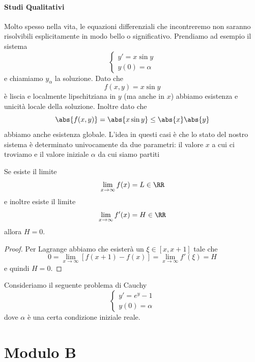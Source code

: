 \documentclass[11pt]{scrartcl}
\begin{document}
	\subsection{Studi Qualitativi}
	
	Molto spesso nella vita, le equazioni differenziali che incontreremo non saranno risolvibili esplicitamente in modo bello o significativo. Prendiamo ad esempio il sistema
	$$
	\begin{cases}
		y'=x\sin y \\
		y(0)=\alpha
	\end{cases}
	$$
	e chiamiamo $y_\alpha$ la soluzione. Dato che 
	$$f(x,y)=x\sin y$$
	è liscia e localmente lipschitziana in $y$ (ma anche in $x$) abbiamo esistenza e unicità locale della soluzione. Inoltre dato che
	$$\abs{f(x,y)}=\abs{x\sin y}\le \abs{x}\abs{y}$$
	abbiamo anche esistenza globale. L'idea in questi casi è che lo stato del nostro sistema è determinato univocamente da due parametri: il valore $x$ a cui ci troviamo e il valore iniziale $\alpha$ da cui siamo partiti
	\begin{theorem}
		Se esiste il limite
		$$\lim_{x\to\infty}f(x)=L\in\RR$$
		e inoltre esiste il limite
		$$\lim_{x\to\infty}f'(x)=H\in\RR$$
		allora $H=0$.
	\end{theorem}	
	\begin{proof}
		Per Lagrange abbiamo che esisterà un $\xi\in [x,x+1]$ tale che
		$$0=\lim_{x\to\infty}\left[f(x+1)-f(x)\right]=\lim_{x\to\infty}f'(\xi)=H$$
		e quindi $H=0$.
	\end{proof}
	\begin{example}[Separabile 1]
		Consideriamo il seguente problema di Cauchy
		$$
		\begin{cases}
			y'=e^y-1 \\
			y(0)=\alpha
		\end{cases}
		$$
		dove $\alpha$ è una certa condizione iniziale reale.
	\end{example}
	
	
	
	\newpage
	
	\part{Modulo B}
	
\end{document}
